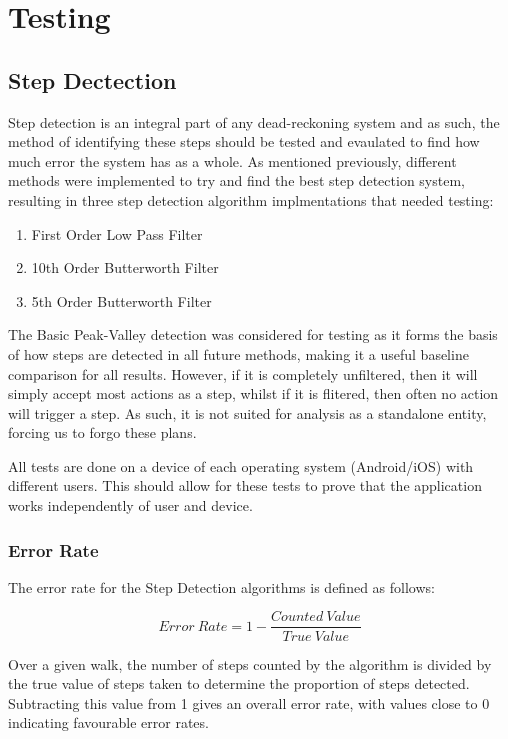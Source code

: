 \documentclass[main.tex]{subfiles}
\begin{document}
\chapter{Testing}

\section{Step Dectection}

Step detection is an integral part of any dead-reckoning system and as such, the method of identifying these steps should be tested and evaulated to find how much error the system has as a whole. As mentioned previously, different methods were implemented to try and find the best step detection system, resulting in three step detection algorithm implmentations that needed testing:
\begin{enumerate}
	\item First Order Low Pass Filter
	\item 10th Order Butterworth Filter
	\item 5th Order Butterworth Filter
\end{enumerate}
The Basic Peak-Valley detection was considered for testing as it forms the basis of how steps are detected in all future methods, making it a useful baseline comparison for all results. However, if it is completely unfiltered, then it will simply accept most actions as a step, whilst if it is flitered, then often no action will trigger a step. As such, it is not suited for analysis as a standalone entity, forcing us to forgo these plans.

All tests are done on a device of each operating system (Android/iOS) with different users. This should allow for these tests to prove that the application works independently of user and device.

\subsection{Error Rate}

The error rate for the Step Detection algorithms is defined as follows:

\begin{equation}
Error\ Rate = 1 - \frac{Counted\ Value}{True\ Value}
\end{equation}

Over a given walk, the number of steps counted by the algorithm is divided by the true value of steps taken to determine the proportion of steps detected. Subtracting this value from 1 gives an overall error rate, with values close to 0 indicating favourable error rates.
\end{document}
